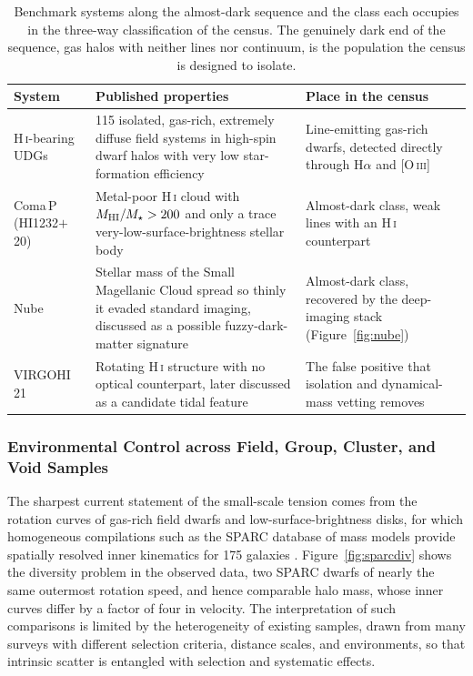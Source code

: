 \begin{table}[htbp]
\centering
\sffamily\small
\begin{tabularx}{\textwidth}{@{}p{3.2cm}p{6.4cm}X@{}}
\toprule
\textbf{System} & \textbf{Published properties} & \textbf{Place in the census}\\
\midrule
H\,\textsc{i}-bearing UDGs & 115 isolated, gas-rich, extremely diffuse field systems in high-spin dwarf halos with very low star-formation efficiency \cite{leisman2017} & Line-emitting gas-rich dwarfs, detected directly through H$\alpha$ and [O\,\textsc{iii}]\\
Coma\,P (HI1232$+$20) & Metal-poor H\,\textsc{i} cloud with $M_{\rm HI}/M_\star>200$ and only a trace very-low-surface-brightness stellar body \cite{janowiecki2015} & Almost-dark class, weak lines with an H\,\textsc{i} counterpart\\
Nube & Stellar mass of the Small Magellanic Cloud spread so thinly it evaded standard imaging, discussed as a possible fuzzy-dark-matter signature \cite{montes2024nube} & Almost-dark class, recovered by the deep-imaging stack (Figure~\ref{fig:nube})\\
VIRGOHI\,21 & Rotating H\,\textsc{i} structure with no optical counterpart, later discussed as a candidate tidal feature \cite{minchin2005,duc2008} & The false positive that isolation and dynamical-mass vetting removes\\
\bottomrule
\end{tabularx}
\caption{Benchmark systems along the almost-dark sequence and the class each occupies in the three-way classification of the census. The genuinely dark end of the sequence, gas halos with neither lines nor continuum, is the population the census is designed to isolate.}
\label{tab:darkbench}
\end{table}

\subsubsection{Environmental Control across Field, Group, Cluster, and Void Samples}

The sharpest current statement of the small-scale tension comes from the rotation curves of gas-rich field dwarfs and low-surface-brightness disks, for which homogeneous compilations such as the SPARC database of mass models provide spatially resolved inner kinematics for 175 galaxies \cite{lelli2016}. Figure~\ref{fig:sparcdiv} shows the diversity problem in the observed data, two SPARC dwarfs of nearly the same outermost rotation speed, and hence comparable halo mass, whose inner curves differ by a factor of four in velocity. The interpretation of such comparisons is limited by the heterogeneity of existing samples, drawn from many surveys with different selection criteria, distance scales, and environments, so that intrinsic scatter is entangled with selection and systematic effects.

